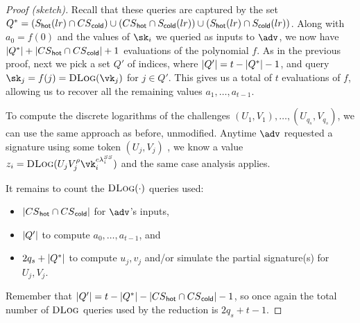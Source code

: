 \begin{proof}[Proof (sketch)]
Recall that these queries are captured by the set $Q^* = (S_{\mathsf{hot}}(lr) \cap {\ensuremath{CS}}_{\mathsf{cold}}) \cup ({CS}_{\mathsf{hot}} \cap S_{\mathsf{cold}}(lr)) \cup (S_{\mathsf{hot}}(lr) \cap S_{\mathsf{cold}}(lr))$. Along with $a_0 = f(0)$ and the values of $\sk_i$ we queried as inputs to $\adv$, we now have $\lvert Q^* \rvert + \lvert {\ensuremath{CS}}_{\mathsf{hot}} \cap {\ensuremath{CS}}_{\mathsf{cold}} \rvert + 1$ evaluations of the polynomial $f$. As in the previous proof, next we pick a set $Q'$ of indices, where $\lvert Q' \rvert = t - \lvert Q^* \rvert - 1$, and query $\sk_j = f(j) = \DLogO(\vk_j)$ for $j \in Q'$. This gives us a total of $t$ evaluations of $f$, allowing us to recover all the remaining values $a_1, \dots, a_{t-1}$.

To compute the discrete logarithms of the challenges $(U_1, V_1), \dots, (U_{q_s}, V_{q_s})$, we can use the same approach as before, unmodified. Anytime $\adv$ requested a signature using some token $(U_j, V_j)$ , we know a value $z_i = \DLogO(U_j V_j^\rho \vk_i^{c \lambda_i^\signset})$ and the same case analysis applies.

It remains to count the ${\textsc{DLog}}(\cdot)$ queries used: 
\begin{itemize}
    \item $\lvert {\ensuremath{CS}}_{\mathsf{hot}} \cap {\ensuremath{CS}}_{\mathsf{cold}} \rvert$ for $\adv$'s inputs, 
    \item $\lvert Q' \rvert$ to compute $a_0, \dots, a_{t-1}$, and
    \item $2 q_s + \lvert Q^* \rvert$ to compute $u_j, v_j$ and/or simulate the partial signature(s) for $U_j, V_j$.
\end{itemize}
Remember that $\lvert Q' \rvert = t - \lvert Q^* \rvert - \lvert {\ensuremath{CS}}_{\mathsf{hot}} \cap {\ensuremath{CS}}_{\mathsf{cold}} \rvert - 1$, so once again the total number of ${\textsc{DLog}}$ queries used by the reduction is $2q_s + t - 1$.


\end{proof}